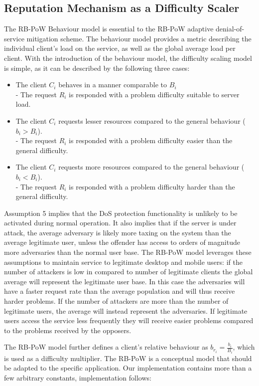 \subsection{Reputation Mechanism as a Difficulty Scaler}\label{text:diffscaler}
The RB-PoW Behaviour model is essential to the RB-PoW adaptive denial-of-service mitigation scheme. The behaviour model provides a metric describing the individual client's load on the service, as well as the global average load per client. 
With the introduction of the behaviour model, the difficulty scaling model is simple, as it can be described by the following three cases:
\begin{itemize}
\item The client $C_i$ behaves in a manner comparable to $B_i$\\
 - The request $R_i$ is responded with a problem difficulty suitable to server load.
\item The client $C_i$ requests lesser resources compared to the general behaviour ($b_i > B_i$).\\
 - The request $R_i$ is responded with a problem difficulty easier than the general difficulty.
\item The client $C_i$ requests more resources compared to the general behaviour ($b_i < B_i$).\\
- The request $R_i$ is responded with a problem difficulty harder than the general difficulty.
\end{itemize}
Assumption 5 implies that the DoS protection functionality is unlikely to be activated during normal operation. It also implies that if the server is under attack, the average adversary is likely more taxing on the system than the average legitimate user, unless the offender has access to orders of magnitude more adversaries than the normal user base. The RB-PoW model leverages these assumptions to maintain service to legitimate desktop and mobile users: if the number of attackers is low in compared to number of legitimate clients the global average will represent the legitimate user base. In this case the adversaries will have a faster request rate than the average population and will thus receive harder problems. If the number of attackers are more than the number of legitimate users, the average will instead represent the adversaries. If legitimate users access the service less frequently they will receive easier problems compared to the problems received by the opposers.

The RB-PoW model further defines a client's relative behaviour as $b_{r_i} = \frac{b_i}{B_i}$, which is used as a difficulty multiplier. The RB-PoW is a conceptual model that should be adapted to the specific application. Our implementation contains more than a few arbitrary constants, implementation follows:

